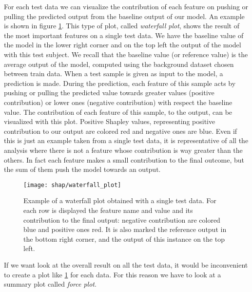 \documentclass[11pt]{report}
\begin{document}
\noindent For each test data we can visualize the contribution of each feature on pushing or pulling the predicted output from the baseline output of our model.
An example is shown in figure \ref{fig:shap_waterfall}.
This type of plot, called \emph{waterfall plot}, shows the result of the most important features on a single test data.
We have the baseline value of the model in the lower right corner and on the top left the output of the model with this test subject.
We recall that the baseline value (or reference value) is the average output of the model, computed using the background dataset chosen between train data.
When a test sample is given as input to the model, a prediction is made.
During the prediction, each feature of this sample acts by pushing or pulling the predicted value towards greater values (positive contribution) or lower ones (negative contribution) with respect the baseline value.
The contribution of each feature of this sample, to the output, can be visualized with this plot.
Positive Shapley values, representing positive contribution to our output are colored red and negative ones are blue.
Even if this is just an example taken from a single test data, it is representative of all the analysis where there is not a feature whose contribution is way greater than the others.
In fact each feature makes a small contribution to the final outcome, but the sum of them push the model towards an output.


\begin{figure}[h]
\centering
\texttt{[image: shap/waterfall\_plot]}
\caption{Example of a waterfall plot obtained with a single test data. For each row is displayed the feature name and value and its contribution to the final output: negative contribution are colored blue and positive ones red. It is also marked the reference output in the bottom right corner, and the output of this instance on the top left.
}\label{fig:shap_waterfall}
\end{figure}


\hfill

If we want look at the overall result on all the test data, it would be inconvenient to create a plot like \ref{fig:shap_waterfall} for each data. For this reason we have to look at a summary plot called \emph{force plot}.
\end{document}
